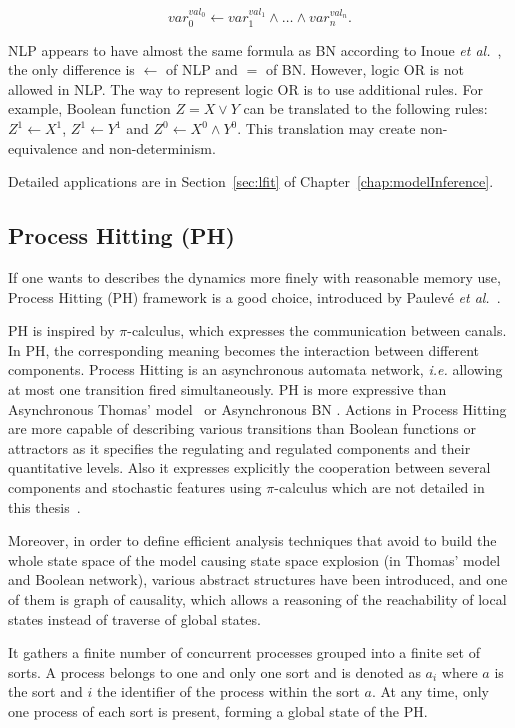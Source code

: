 $$var_0^{val_0} \gets var_1^{val_1}\land \ldots \land var_n^{val_n}.$$

\begin{remark}
NLP appears to have almost the same formula as BN according to Inoue \textit{et al.}~\cite{inoue2011logic}, the only difference is $\gets$ of NLP and $=$ of BN.
However, logic OR is not allowed in NLP.
The way to represent logic OR is to use additional rules.
For example, Boolean function $Z=X\lor Y$ can be translated to the following rules: $Z^1\gets X^1$, $Z^1\gets Y^1$ and $Z^0\gets X^0\land Y^0$.
This translation may create non-equivalence and non-determinism.
\end{remark}

Detailed applications are in Section~\ref{sec:lfit} of Chapter~\ref{chap:modelInference}.

\subsection{Process Hitting (PH)}
If one wants to describes the dynamics more finely with reasonable memory use, Process Hitting (PH) framework is a good choice,   introduced by Paulev\'e \textit{et al.}~\cite{pauleve2011}.

PH is inspired by $\pi$-calculus, which expresses the communication between canals. 
In PH, the corresponding meaning becomes the interaction between different components.
Process Hitting is an asynchronous automata network, \textit{i.e.} allowing at most one transition fired simultaneously. 
PH is more expressive than Asynchronous Thomas' model~\cite{thomas1978} or Asynchronous BN . 
Actions in Process Hitting are more capable of describing various transitions than Boolean functions or attractors as it specifies the regulating and regulated components and their quantitative levels.
Also it expresses explicitly the cooperation between several components and stochastic features using $\pi$-calculus which are not detailed in this thesis~\cite{pauleve2014}.

Moreover, in order to define efficient analysis techniques that avoid to build the whole state space of the model causing state space explosion (in Thomas' model and Boolean network), various abstract structures have been introduced, and one of them is graph of causality, which allows a reasoning of the reachability of local states instead of traverse of global states.

It gathers a finite number of concurrent processes grouped into a finite set of sorts. A process belongs to one and only one sort and is denoted as $a_i$ where $a$ is the sort and $i$ the identifier of the process within the sort $a$.
At any time, only one process of each sort is present, forming a global state of the PH.

